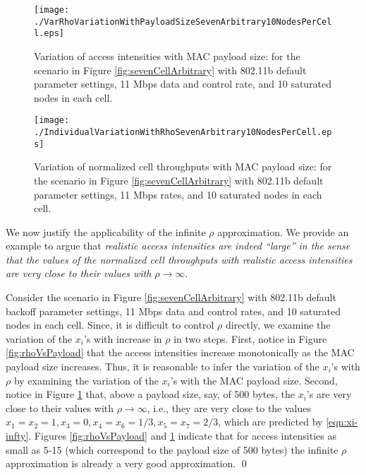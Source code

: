 \documentclass[10pt,a4paper,journal]{IEEEtran}
\theoremstyle{definition}
\theoremstyle{remark}
\theoremstyle{plain}
\begin{document}
\begin{figure}[tb]
\centering
\begin{minipage}{8.25cm}
\begin{center}
\texttt{[image: ./VarRhoVariationWithPayloadSizeSevenArbitrary10NodesPerCell.eps]}
\caption{Variation of access intensities with MAC payload size: for the scenario in Figure \ref{fig:sevenCellArbitrary} with 802.11b default parameter settings, 11 Mbps data and control rate, and 10 saturated nodes in each cell. \label{fig:rhoVsPayload}}
\end{center}
\end{minipage}
\hfill
\begin{minipage}{8.25cm}
\begin{center}
\texttt{[image: ./IndividualVariationWithRhoSevenArbitrary10NodesPerCell.eps]}
\caption{Variation of normalized cell throughputs with MAC payload size: 
for the scenario in Figure \ref{fig:sevenCellArbitrary} with 802.11b default parameter settings, 11 Mbps rates, and 10 saturated nodes in each cell.\label{fig:xVsPayload}}
\end{center}
\end{minipage}
\end{figure}


We now justify the applicability of the infinite $\rho$ approximation. We provide an example to argue that \textit{realistic access intensities are indeed ``large'' in the sense that the values of the normalized cell throughputs with realistic access intensities are very close to their values with $\rho \longrightarrow \infty$}. 

\begin{example}
\label{ex:justifying-infinite-rho}
Consider the scenario in Figure \ref{fig:sevenCellArbitrary} with 802.11b default backoff parameter settings, 11 Mbps data and control rates, and 10 saturated nodes in each cell. Since, it is difficult to control $\rho$ directly, we examine the variation of the $x_i$'s with increase in $\rho$ in two steps. First, notice in Figure \ref{fig:rhoVsPayload} that the access intensities increase monotonically as the MAC payload size increases. Thus, it is reasonable to infer the variation of the $x_i$'s with $\rho$ by examining the variation of the $x_i$'s with the MAC payload size. Second, notice in Figure \ref{fig:xVsPayload} that, above a payload size, say, of 500 bytes, the $x_i$'s are very close to their values with $\rho \rightarrow \infty$, i.e., they are very close to the values $x_1 = x_2 = 1, x_3 = 0, x_4 = x_6 = 1/3, x_5 = x_7 = 2/3$, which are predicted by \eqref{eqn:xi-infty}. Figures \ref{fig:rhoVsPayload} and \ref{fig:xVsPayload} indicate that for access intensities as small as 5-15 (which correspond to the payload size of 500 bytes) the infinite $\rho$ approximation is already a very good approximation. \hfill \qed
\end{example}
\end{document}
